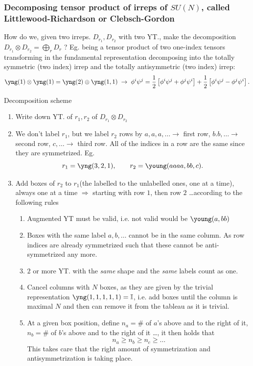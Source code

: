 \subsubsection{Decomposing tensor product of irreps of $SU(N)$, called Littlewood-Richardson or Clebsch-Gordon}
How do we, given two irreps. $D_{r_1},D_{r_2}$ with two YT., make the decomposition $D_{r_1} \otimes D_{r_2} = \bigoplus_r D_r$ ? Eg. being a tensor product of two one-index tensors transforming in the fundamental representation decomposing into the totally symmetric (two index) irrep and the totally antisymmetric (two index) irrep:
\begin{equation}
	\yng(1) \otimes \yng(1) = \yng(2) \oplus \yng(1,1) \; \rightarrow \; \phi^i \psi^j = \half \left[\phi^i \psi^j + \phi^j \psi^i\right] + \half \left[\phi^i \psi^j - \phi^j \psi^i\right].
\end{equation}
\begin{mybox}{Decomposition scheme}
	\begin{enumerate}
		\item Write down YT. of $r_1,r_2$ of $D_{r_1} \otimes D_{r_2}$
		\item We don't label $r_1$, but we label $r_2$ rows by $a,a,a,\dots \rightarrow$ first row, $b.b,\dots \rightarrow$ second row, $c,\dots \rightarrow$ third row. All of the indices in a row are the same since they are symmetrized. Eg.
		\begin{equation}
			r_1= \yng(3,2,1), \qquad r_2= \young(aaaa,bb,c).
		\end{equation}
		\item Add boxes of $r_2$ to $r_1$(the labelled to the unlabelled ones, one at a time), always one at a time $\Rightarrow$ starting with row $1$, then row $2$ \dots according to the following rules
		\begin{enumerate}
			\item Augmented YT must be valid, i.e. not valid would be $\young(a,bb)$
			\item Boxes with the same label $a,b,\dots$ cannot be in the same column. As row indices are already symmetrized such that these cannot be anti-symmetrized any more.
			\item $2$ or more YT. with the \emph{same} shape and the \emph{same} labels count as one.
			\item Cancel columns with $N$ boxes, as they are given by the trivial representation $\yng(1,1,1,1,1) = \mI$, i.e. add boxes until the column is maximal $N$ and then can remove it from the tableau as it is trivial.
			\item At a given box position, define $n_a=\#$ of $a$'s above and to the right of it, $n_b=\#$ of $b$'s above and to the right of it \dots, it then holds that
			\begin{equation}
				n_a \geq n_b \geq n_c \geq \dots 
			\end{equation}
			This takes care that the right amount of symmetrization and antisymmetrization is taking place.
		\end{enumerate}
		\end{enumerate}
\end{mybox}

